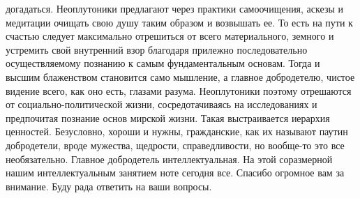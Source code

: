 догадаться. Неоплутоники предлагают через практики самоочищения, аскезы и
медитации очищать свою душу таким образом и возвышать ее. То есть на пути к
счастью следует максимально отрешиться от всего материального, земного и
устремить свой внутренний взор благодаря прилежно последовательно
осуществляемому познанию к самым фундаментальным основам. Тогда и высшим
блаженством становится само мышление, а главное добродетелю, чистое видение
всего, как оно есть, глазами разума. Неоплутоники поэтому отрешаются от
социально-политической жизни, сосредотачиваясь на исследованиях и предпочитая
познание основ мирской жизни. Такая выстраивается иерархия ценностей.
Безусловно, хороши и нужны, гражданские, как их называют паутин добродетели,
вроде мужества, щедрости, справедливости, но вообще-то это все необязательно.
Главное добродетель интеллектуальная. На этой соразмерной нашим интеллектуальным
занятием ноте сегодня все. Спасибо огромное вам за внимание. Буду рада ответить
на ваши вопросы.
